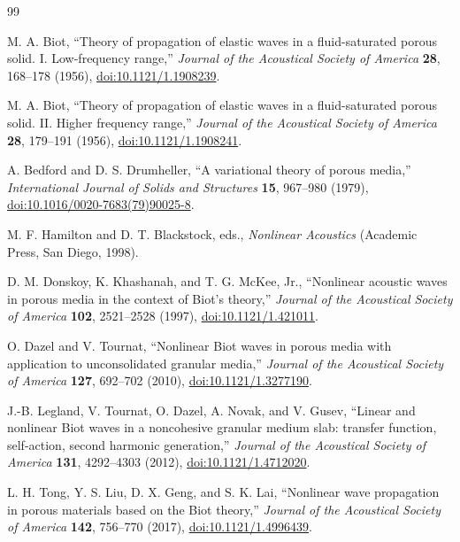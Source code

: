 \documentclass[11pt]{article}
\begin{document}
\begin{thebibliography}{99}
\small

M. A. Biot,
``Theory of propagation of elastic waves in a fluid-saturated porous solid.
I. Low-frequency range,''
\emph{Journal of the Acoustical Society of America} \textbf{28}, 168--178
(1956),
\href{https://doi.org/10.1121/1.1908239}{doi:10.1121/1.1908239}.

M. A. Biot,
``Theory of propagation of elastic waves in a fluid-saturated porous solid.
II. Higher frequency range,''
\emph{Journal of the Acoustical Society of America} \textbf{28}, 179--191
(1956),
\href{https://doi.org/10.1121/1.1908241}{doi:10.1121/1.1908241}.

A. Bedford and D. S. Drumheller,
``A variational theory of porous media,''
\emph{International Journal of Solids and Structures} \textbf{15}, 967--980
(1979),
\href{https://doi.org/10.1016/0020-7683(79)90025-8}{doi:10.1016/0020-7683(79)90025-8}.

M. F. Hamilton and D. T. Blackstock, eds.,
\emph{Nonlinear Acoustics}
(Academic Press, San Diego, 1998).

D. M. Donskoy, K. Khashanah, and T. G. McKee, Jr.,
``Nonlinear acoustic waves in porous media in the context of Biot's theory,''
\emph{Journal of the Acoustical Society of America} \textbf{102}, 2521--2528
(1997),
\href{https://doi.org/10.1121/1.421011}{doi:10.1121/1.421011}.

O. Dazel and V. Tournat,
``Nonlinear Biot waves in porous media with application to unconsolidated
granular media,''
\emph{Journal of the Acoustical Society of America} \textbf{127}, 692--702
(2010),
\href{https://doi.org/10.1121/1.3277190}{doi:10.1121/1.3277190}.

J.-B. Legland, V. Tournat, O. Dazel, A. Novak, and V. Gusev,
``Linear and nonlinear Biot waves in a noncohesive granular medium slab:
transfer function, self-action, second harmonic generation,''
\emph{Journal of the Acoustical Society of America} \textbf{131}, 4292--4303
(2012),
\href{https://doi.org/10.1121/1.4712020}{doi:10.1121/1.4712020}.

L. H. Tong, Y. S. Liu, D. X. Geng, and S. K. Lai,
``Nonlinear wave propagation in porous materials based on the Biot theory,''
\emph{Journal of the Acoustical Society of America} \textbf{142}, 756--770
(2017),
\href{https://doi.org/10.1121/1.4996439}{doi:10.1121/1.4996439}.


\end{thebibliography}
\end{document}
